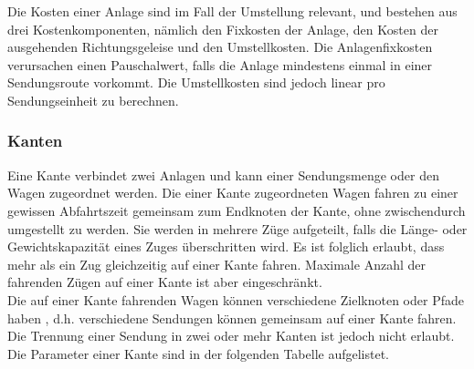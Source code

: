 Die Kosten einer Anlage sind im Fall der Umstellung relevant, und bestehen aus drei Kostenkomponenten, nämlich den Fixkosten der Anlage, den Kosten der ausgehenden Richtungsgeleise und den Umstellkosten. Die Anlagenfixkosten verursachen einen Pauschalwert, falls die Anlage mindestens einmal in einer Sendungsroute vorkommt. Die Umstellkosten sind jedoch linear pro Sendungseinheit zu berechnen.

\subsubsection{Kanten}
Eine Kante verbindet zwei Anlagen und kann einer Sendungsmenge oder den Wagen zugeordnet werden. Die einer Kante zugeordneten Wagen fahren zu einer gewissen Abfahrtszeit gemeinsam  zum Endknoten der Kante, ohne zwischendurch umgestellt zu werden. Sie werden in mehrere Züge aufgeteilt, falls die Länge- oder Gewichtskapazität eines Zuges überschritten wird. Es ist folglich erlaubt, dass mehr als ein Zug gleichzeitig auf einer Kante fahren. Maximale Anzahl der fahrenden Zügen auf einer Kante ist aber eingeschränkt.\\
Die auf einer Kante fahrenden Wagen können verschiedene Zielknoten oder Pfade haben , d.h. verschiedene Sendungen können gemeinsam auf einer Kante fahren. Die Trennung einer Sendung in zwei oder mehr Kanten ist jedoch nicht erlaubt. \\
Die Parameter einer Kante sind in der folgenden Tabelle aufgelistet.

